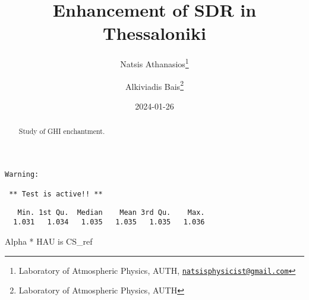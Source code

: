 \documentclass[
  10pt,
  a4paper,oneside]{article}
\title{Enhancement of SDR in Thessaloniki}
\author{Natsis Athanasios\footnote{Laboratory of Atmospheric Physics, AUTH, \href{mailto:natsisphysicist@gmail.com}{\nolinkurl{natsisphysicist@gmail.com}}} \and Alkiviadis Bais\footnote{Laboratory of Atmospheric Physics, AUTH}}
\date{2024-01-26}
\begin{document}
\maketitle
\begin{abstract}
Study of GHI enchantment.
\end{abstract}

{
\hypersetup{linkcolor=}
\setcounter{tocdepth}{4}
\tableofcontents
}
\begin{verbatim}
Warning: 

 ** Test is active!! ** 
\end{verbatim}

\begin{verbatim}
   Min. 1st Qu.  Median    Mean 3rd Qu.    Max. 
  1.031   1.034   1.035   1.035   1.035   1.036 
\end{verbatim}

Alpha * HAU is CS\_ref
\end{document}
